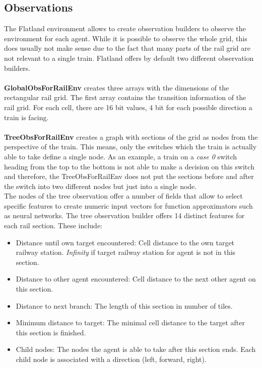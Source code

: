 \subsection*{Observations}\label{observations}
The Flatland environment allows to create observation builders to observe the environment for each agent. While it is possible to observe the whole grid, this does usually not make sense due to the fact that many parts of the rail grid are not relevant to a single train. Flatland offers by default two different observation builders.\\\\
\textbf{GlobalObsForRailEnv} creates three arrays with the dimensions of the rectangular rail grid. The first array contains the transition information of the rail grid. For each cell, there are 16 bit values, 4 bit for each possible direction a train is facing.\\\\
\textbf{TreeObsForRailEnv} creates a graph with sections of the grid as nodes from the perspective of the train.
This means, only the switches which the train is actually able to take define a single node. As an example, a train on a \textit{case 0} switch heading from the top to the bottom is not able to make a decision on this switch and therefore, the TreeObsForRailEnv does not put the sections before and after the switch into two different nodes but just into a single node.\\
The nodes of the tree observation offer a number of fields that allow to select specific features to create numeric input vectors for function approximators such as neural networks. The tree observation builder offers 14 distinct features for each rail section. These include:
\begin{itemize}
	\item Distance until own target encountered: Cell distance to the own target railway station. \textit{Infinity} if target railway station for agent is not in this section.
	\item Distance to other agent encountered: Cell distance to the next other agent on this section.
	\item Distance to next branch: The length of this section in number of tiles.
	\item Minimum distance to target: The minimal cell distance to the target after this section is finished.
	\item Child nodes: The nodes the agent is able to take after this section ends. Each child node is associated with a direction (left, forward, right).
\end{itemize}
